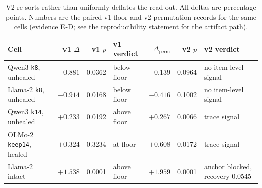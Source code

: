 \begin{table}[t]
\centering
\scriptsize
\setlength{\tabcolsep}{2.8pt}
\begin{tabular}{lrrlrrl}
\toprule
Cell & v1 $\Delta$ & v1 $p$ & v1 verdict & $\Delta_{\mathrm{perm}}$ & v2 $p$ & v2 verdict \\
\midrule
Qwen3 \texttt{k8}, unhealed & $-0.881$ & 0.0362 & below floor & $-0.139$ & 0.0964 & no item-level signal \\
Llama-2 \texttt{k8}, unhealed & $-0.914$ & 0.0168 & below floor & $-0.416$ & 0.1002 & no item-level signal \\
Qwen3 \texttt{k14}, unhealed & $+0.233$ & 0.0192 & above floor & $+0.267$ & 0.0066 & trace signal \\
OLMo-2 \texttt{keep14}, healed & $+0.324$ & 0.3234 & at floor & $+0.608$ & 0.0172 & trace signal \\
Llama-2 intact & $+1.538$ & 0.0001 & above floor & $+1.959$ & 0.0001 & anchor blocked, recovery 0.0545 \\
\bottomrule
\end{tabular}
\caption{V2 re-sorts rather than uniformly deflates the read-out. All deltas are percentage points. Numbers are the paired v1-floor and v2-permutation records for the same cells (evidence \textsf{E-D}; see the reproducibility statement for the artifact path).}
\label{tab:v2-resort}
\end{table}
